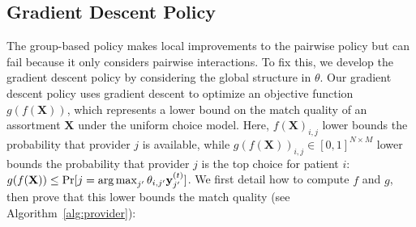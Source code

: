 \subsection{Gradient Descent Policy}
\label{sec:lower_bound}
The group-based policy makes local improvements to the pairwise policy but can fail because it only considers pairwise interactions. 
To fix this, we develop the gradient descent policy by considering the global structure in $\theta$. 
Our gradient descent policy uses gradient descent to optimize an objective function $g(f(\mathbf{X}))$, which represents a lower bound on the match quality of an assortment $\mathbf{X}$ under the uniform choice model. 
Here, $f(\mathbf{X})_{i,j}$ lower bounds the probability that provider $j$ is available, while $g(f(\mathbf{X}))_{i,j} \in [0,1]^{N \times M}$ lower bounds the probability that provider $j$ is the top choice for patient $i$: $g(f(\mathbf{X})) \leq \mathrm{Pr}[j = \operatorname*{arg\,max}_{j'} \theta_{i,j'} \mathbf{y}^{(t)}_{j'}]$.
We first detail how to compute $f$ and $g$, then prove that this lower bounds the match quality (see Algorithm~\ref{alg:provider}): 

